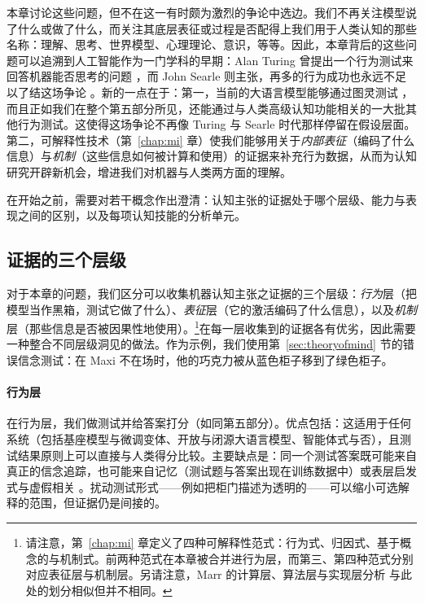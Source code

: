 本章讨论这些问题，但不在这一有时颇为激烈的争论中选边。我们不再关注模型说了什么或做了什么，而关注其底层表征或过程是否配得上我们用于人类认知的那些名称：理解、思考、世界模型、心理理论、意识，等等。因此，本章背后的这些问题可以追溯到人工智能作为一门学科的早期：Alan Turing 曾提出一个行为测试来回答机器能否思考的问题 \citep{turing1950computing}，而 John Searle 则主张，再多的行为成功也永远不足以了结这场争论 \citep{searle1980minds}。新的一点在于：第一，当前的大语言模型能够通过图灵测试 \citep{jones2025turing, gibney2025turing}，而且正如我们在整个第五部分所见，还能通过与人类高级认知功能相关的一大批其他行为测试。这使得这场争论不再像 Turing 与 Searle 时代那样停留在假设层面。第二，可解释性技术（第~\ref{chap:mi} 章）使我们能够用关于\emph{内部表征}（编码了什么信息）与\emph{机制}（这些信息如何被计算和使用）的证据来补充行为数据，从而为认知研究开辟新机会，增进我们对机器与人类两方面的理解。

在开始之前，需要对若干概念作出澄清：认知主张的证据处于哪个层级、能力与表现之间的区别，以及每项认知技能的分析单元。

\subsection{证据的三个层级}\label{sec:levels}
对于本章的问题，我们区分可以收集机器认知主张之证据的三个层级：\emph{行为}层（把模型当作黑箱，测试它做了什么）、\emph{表征}层（它的激活编码了什么信息），以及\emph{机制}层（那些信息是否被因果性地使用）。\footnote{请注意，第~\ref{chap:mi} 章定义了四种可解释性范式：行为式、归因式、基于概念的与机制式。前两种范式在本章被合并进行为层，而第三、第四种范式分别对应表征层与机制层。另请注意，Marr 的计算层、算法层与实现层分析 \citep{marr1982vision} 与此处的划分相似但并不相同。}在每一层收集到的证据各有优劣，因此需要一种整合不同层级洞见的做法。作为示例，我们使用第~\ref{sec:theoryofmind} 节的错误信念测试：在 Maxi 不在场时，他的巧克力被从蓝色柜子移到了绿色柜子。

\paragraph{行为层} 在行为层，我们做测试并给答案打分（如同第五部分）。优点包括：这适用于任何系统（包括基座模型与微调变体、开放与闭源大语言模型、智能体式与否），且测试结果原则上可以直接与人类得分比较。主要缺点是：同一个测试答案既可能来自真正的信念追踪，也可能来自记忆（测试题与答案出现在训练数据中）或表层启发式与虚假相关 \citep[相关讨论见][]{hu2025reevaluatingtheorymindevaluation,kouwenhoven2026traces}。扰动测试形式——例如把柜门描述为透明的——可以缩小可选解释的范围，但证据仍是间接的。

